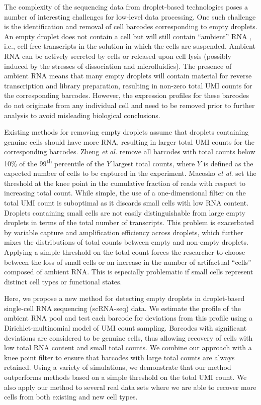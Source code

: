 \documentclass[10pt,letterpaper]{article}
\begin{document}
The complexity of the sequencing data from droplet-based technologies poses a number of interesting challenges for low-level data processing.
One such challenge is the identification and removal of cell barcodes corresponding to empty droplets.
An empty droplet does not contain a cell but will still contain ``ambient'' RNA \cite{macosko2015highly}, i.e., cell-free transcripts in the solution in which the cells are suspended.
Ambient RNA can be actively secreted by cells or released upon cell lysis (possibly induced by the stresses of dissociation and microfluidics).
The presence of ambient RNA means that many empty droplets will contain material for reverse transcription and library preparation, resulting in non-zero total UMI counts for the corresponding barcodes.
However, the expression profiles for these barcodes do not originate from any individual cell and need to be removed prior to further analysis to avoid misleading biological conclusions.

Existing methods for removing empty droplets assume that droplets containing genuine cells should have more RNA, resulting in larger total UMI counts for the corresponding barcodes.
Zheng \textit{et al.} \cite{zheng2017massively} remove all barcodes with total counts below 10\% of the 99\textsuperscript{th} percentile of the $Y$ largest total counts, where $Y$ is defined as the expected number of cells to be captured in the experiment.
Macosko \textit{et al.} \cite{macosko2015highly} set the threshold at the knee point in the cumulative fraction of reads with respect to increasing total count.
While simple, the use of a one-dimensional filter on the total UMI count is suboptimal as it discards small cells with low RNA content.
Droplets containing small cells are not easily distinguishable from large empty droplets in terms of the total number of transcripts.
This problem is exacerbated by variable capture and amplification efficiency across droplets, which further mixes the distributions of total counts between empty and non-empty droplets.
Applying a simple threshold on the total count forces the researcher to choose between the loss of small cells or an increase in the number of artifactual ``cells'' composed of ambient RNA.
This is especially problematic if small cells represent distinct cell types or functional states.

Here, we propose a new method for detecting empty droplets in droplet-based single-cell RNA sequencing (scRNA-seq) data.
We estimate the profile of the ambient RNA pool and test each barcode for deviations from this profile using a Dirichlet-multinomial model of UMI count sampling.
Barcodes with significant deviations are considered to be genuine cells, thus allowing recovery of cells with low total RNA content and small total counts.
We combine our approach with a knee point filter to ensure that barcodes with large total counts are always retained.
Using a variety of simulations, we demonstrate that our method outperforms methods based on a simple threshold on the total UMI count.
We also apply our method to several real data sets where we are able to recover more cells from both existing and new cell types.
\end{document}
